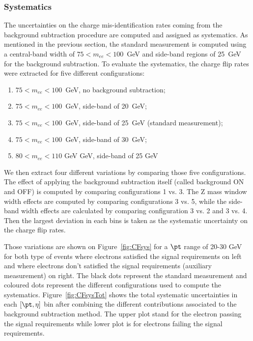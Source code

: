 \FloatBarrier


\subsubsection{Systematics}
\label{subsec:CFsysSection}

The uncertainties on the charge mis-identification rates coming from the background subtraction procedure are computed and assigned as systematics. As mentioned in the previous section, the standard measurement is computed using a central-band width of $75<m_{ee}<100$~GeV and side-band regions of 25~GeV for the background subtraction. To evaluate the systematics, the charge flip rates were extracted for five different configurations: 
\begin{enumerate}
\item $75<m_{ee}<100$~GeV, no background subtraction; 
\item $75<m_{ee}<100$~GeV, side-band of 20~GeV;
\item $75<m_{ee}<100$~GeV, side-band of 25~GeV (standard measurement);
\item $75<m_{ee}<100$~GeV, side-band of 30~GeV; 
\item $80<m_{ee}<110$ GeV GeV, side-band of 25 GeV
\end{enumerate}
We then extract four different variations by comparing those five configurations. The effect of applying the background subtraction itself (called background ON and OFF) is computed by comparing configurations 1 vs. 3. The Z mass window width effects are computed by comparing configurations 3 vs. 5, while the side-band width effects are calculated by comparing configuration 3 vs. 2 and 3 vs. 4. Then the largest deviation in each bins is taken as the systematic uncertainty on the charge flip rates. 

Those variations are shown on Figure~\ref{fig:CFsys} for a $\pt$ range of 20-30 GeV for both type of events where electrons satisfied the signal requirements on left and where electrons don't satisfied the signal requirements (auxiliary measurement) on right. The black dots represent the standard measurement and coloured dots represent the different configurations used to compute the systematics. Figure~\ref{fig:CFsysTot} shows the total systematic uncertainties in each $[\pt,\eta]$ bin after combining the different contributions associated to the background subtraction method. The upper plot stand for the electron passing the signal requirements while lower plot is for electrons failing the signal requirements.

